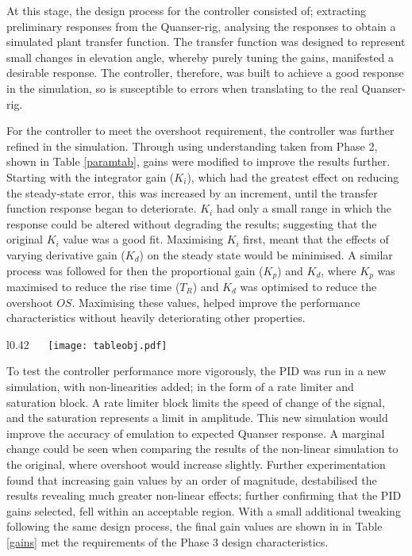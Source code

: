 At this stage, the design process for the controller consisted of;
extracting preliminary responses from the Quanser-rig, analysing the
responses to obtain a simulated plant transfer function. The transfer
function was designed to represent small changes in elevation angle,
whereby purely tuning the gains, manifested a desirable response. The
controller, therefore, was built to achieve a good response in the
simulation, so is susceptible to errors when translating to the real
Quanser-rig.

For the controller to meet the overshoot requirement, the controller was
further refined in the simulation. Through using understanding taken
from Phase 2, shown in Table \ref{paramtab}, gains were modified to
improve the results further. Starting with the integrator gain
(\(K_i\)), which had the greatest effect on reducing the steady-state
error, this was increased by an increment, until the transfer function
response began to deteriorate. \(K_i\) had only a small range in which
the response could be altered without degrading the results; suggesting
that the original \(K_i\) value was a good fit. Maximising \(K_i\)
first, meant that the effects of varying derivative gain (\(K_d\)) on
the steady state would be minimised. A similar process was followed for
then the proportional gain (\(K_p\)) and \(K_d\), where \(K_p\) was
maximised to reduce the rise time (\(T_R\)) and \(K_d\) was optimised to
reduce the overshoot \(OS\). Maximising these values, helped improve the
performance characteristics without heavily deteriorating other
properties.

\begin{wrapfigure}{l}{0.42\textwidth}
 \vspace{-25pt}
\centering
{}
\vspace{-5pt}
 \texttt{[image: tableobj.pdf]}
 \vspace{-25pt}
 \label{paramtab}
 \end{wrapfigure}

To test the controller performance more vigorously, the PID was run in a
new simulation, with non-linearities added; in the form of a rate
limiter and saturation block. A rate limiter block limits the speed of
change of the signal, and the saturation represents a limit in
amplitude. This new simulation would improve the accuracy of emulation
to expected Quanser response. A marginal change could be seen when
comparing the results of the non-linear simulation to the original,
where overshoot would increase slightly. Further experimentation found
that increasing gain values by an order of magnitude, destabilised the
results revealing much greater non-linear effects; further confirming
that the PID gains selected, fell within an acceptable region. With a
small additional tweaking following the same design process, the final
gain values are shown in in Table \ref{gains} met the requirements of
the Phase 3 design characteristics.

